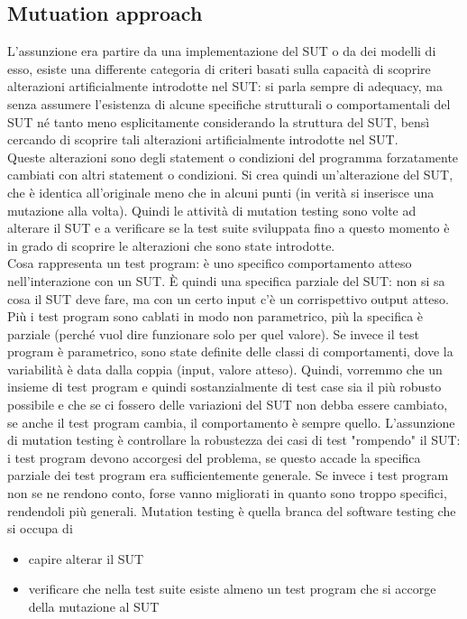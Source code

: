 \documentclass{article}
\begin{document}
\subsection{Mutuation approach}
L'assunzione era partire da una implementazione del SUT o da dei modelli di esso, esiste una differente categoria di criteri basati sulla capacità di scoprire alterazioni artificialmente introdotte nel SUT: si parla sempre di adequacy, ma senza assumere l'esistenza di alcune specifiche strutturali o comportamentali del SUT né tanto meno esplicitamente considerando la struttura del SUT, bensì cercando di scoprire tali alterazioni artificialmente introdotte nel SUT.\\ Queste alterazioni sono degli statement o condizioni del programma forzatamente cambiati con altri statement o condizioni. Si crea quindi un'alterazione del SUT, che è identica all'originale meno che in alcuni punti (in verità si inserisce una mutazione alla volta). Quindi le attività di mutation testing sono volte ad alterare il SUT e a verificare se la test suite sviluppata fino a questo momento è in grado di scoprire le alterazioni che sono state introdotte.\\ Cosa rappresenta un test program: è uno specifico comportamento atteso nell'interazione con un SUT. È quindi una specifica parziale del SUT: non si sa cosa il SUT deve fare, ma con un certo input c'è un corrispettivo output atteso. Più i test program sono cablati in modo non parametrico, più la specifica è parziale (perché vuol dire funzionare solo per quel valore). Se invece il test program è parametrico, sono state definite delle classi di comportamenti, dove la variabilità è data dalla coppia (input, valore atteso). Quindi, vorremmo che un insieme di test program e quindi sostanzialmente di test case sia il più robusto possibile e che se ci fossero delle variazioni del SUT non debba essere cambiato, se anche il test program cambia, il comportamento è sempre quello. L'assunzione di mutation testing è controllare la robustezza dei casi di test "rompendo" il SUT: i test program devono accorgesi del problema, se questo accade la specifica parziale dei test program era sufficientemente generale. Se invece i test program non se ne rendono conto, forse vanno migliorati in quanto sono troppo specifici, rendendoli più generali. Mutation testing è quella branca del software testing che si occupa di
\begin{itemize}
\item capire alterar il SUT
\item verificare che nella test suite esiste almeno un test program che si accorge della mutazione al SUT
\end{itemize}
\end{document}
